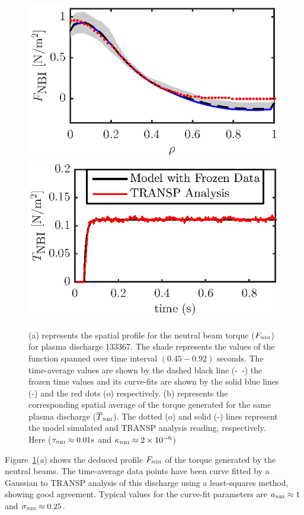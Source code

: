\documentclass[12pt]{iopart}
\begin{document}
\begin{figure}
\includegraphics{imene_figs/fig4a} \hspace{-2.7em} \\[-1em] %
\includegraphics{imene_figs/fig4b} \hspace{-2.7em}          %
\caption{(a) represents the spatial profile for the neutral beam torque ($F_\textrm{\tiny{NBI}} $) for plasma discharge 133367.  The shade represents the values of the function spanned over time interval $(0.45-0.92)$ seconds.  The time-average values are shown by the dashed black line (-~-) the frozen time values and its curve-fits are shown by the solid blue lines (-) and the red dots (o) respectively. (b) represents the corresponding spatial average of the torque generated for the same plasma discharge ($ \overline{T}_\textrm{\tiny{NBI}}$). The dotted (o) and  solid (-) lines represent the model simulated and TRANSP analysis reading, respectively.  Here ($\tau_\textrm{\tiny{NBI}} \approx 0.01 \textrm{s}$ and $\kappa_\textrm{\tiny{NBI}} \approx 2\times10^{-6} $)}
\label{fig:Fnbi}
\end{figure}
Figure~{\ref{fig:Fnbi}}(\emph{a}) shows the deduced profile $F_\textrm{\tiny{NBI}}$ of the torque generated by the neutral beams. The time-average data points have been curve fitted by a Gaussian to TRANSP analysis of this discharge using a least-squares method, showing good agreement.  Typical values for the curve-fit parameters are $a_\textrm{\tiny{NBI}} \approx 1$ and $\sigma_\textrm{\tiny{NBI}} \approx 0.25$.
\end{document}
